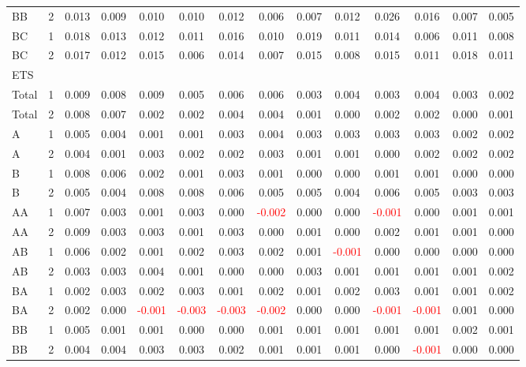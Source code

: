 \begin{table}[H]
{\begin{tabular}{llcccccccccccc}
BB & 2 & 0.013 & 0.009 & 0.010 & 0.010 & 0.012 & 0.006 & 0.007 & 0.012 & 0.026 & 0.016 & 0.007 & 0.005\\
BC & 1 & 0.018 & 0.013 & 0.012 & 0.011 & 0.016 & 0.010 & 0.019 & 0.011 & 0.014 & 0.006 & 0.011 & 0.008\\
BC & 2 & 0.017 & 0.012 & 0.015 & 0.006 & 0.014 & 0.007 & 0.015 & 0.008 & 0.015 & 0.011 & 0.018 & 0.011\\
\hline
ETS &  &  &  &  &  &  &  &  &  &  &  &  & \\
\hline
Total & 1 & 0.009 & 0.008 & 0.009 & 0.005 & 0.006 & 0.006 & 0.003 & 0.004 & 0.003 & 0.004 & 0.003 & 0.002\\
Total & 2 & 0.008 & 0.007 & 0.002 & 0.002 & 0.004 & 0.004 & 0.001 & 0.000 & 0.002 & 0.002 & 0.000 & 0.001\\
A & 1 & 0.005 & 0.004 & 0.001 & 0.001 & 0.003 & 0.004 & 0.003 & 0.003 & 0.003 & 0.003 & 0.002 & 0.002\\
A & 2 & 0.004 & 0.001 & 0.003 & 0.002 & 0.002 & 0.003 & 0.001 & 0.001 & 0.000 & 0.002 & 0.002 & 0.002\\
B & 1 & 0.008 & 0.006 & 0.002 & 0.001 & 0.003 & 0.001 & 0.000 & 0.000 & 0.001 & 0.001 & 0.000 & 0.000\\
B & 2 & 0.005 & 0.004 & 0.008 & 0.008 & 0.006 & 0.005 & 0.005 & 0.004 & 0.006 & 0.005 & 0.003 & 0.003\\
AA & 1 & 0.007 & 0.003 & 0.001 & 0.003 & 0.000 & \textcolor{red}{-0.002} & 0.000 & 0.000 & \textcolor{red}{-0.001} & 0.000 & 0.001 & 0.001\\
AA & 2 & 0.009 & 0.003 & 0.003 & 0.001 & 0.003 & 0.000 & 0.001 & 0.000 & 0.002 & 0.001 & 0.001 & 0.000\\
AB & 1 & 0.006 & 0.002 & 0.001 & 0.002 & 0.003 & 0.002 & 0.001 & \textcolor{red}{-0.001} & 0.000 & 0.000 & 0.000 & 0.000\\
AB & 2 & 0.003 & 0.003 & 0.004 & 0.001 & 0.000 & 0.000 & 0.003 & 0.001 & 0.001 & 0.001 & 0.001 & 0.002\\
BA & 1 & 0.002 & 0.003 & 0.002 & 0.003 & 0.001 & 0.002 & 0.001 & 0.002 & 0.003 & 0.001 & 0.001 & 0.002\\
BA & 2 & 0.002 & 0.000 & \textcolor{red}{-0.001} & \textcolor{red}{-0.003} & \textcolor{red}{-0.003} & \textcolor{red}{-0.002} & 0.000 & 0.000 & \textcolor{red}{-0.001} & \textcolor{red}{-0.001} & 0.001 & 0.000\\
BB & 1 & 0.005 & 0.001 & 0.001 & 0.000 & 0.000 & 0.001 & 0.001 & 0.001 & 0.001 & 0.001 & 0.002 & 0.001\\
BB & 2 & 0.004 & 0.004 & 0.003 & 0.003 & 0.002 & 0.001 & 0.001 & 0.001 & 0.000 & \textcolor{red}{-0.001} & 0.000 & 0.000\\

\end{tabular}}
\end{table}
